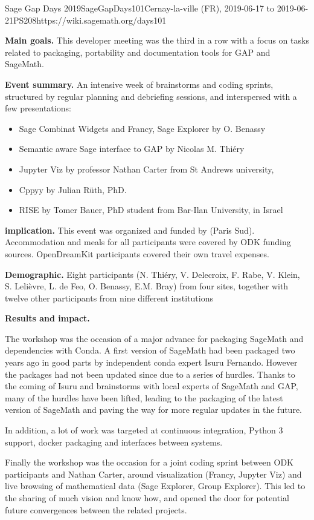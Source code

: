 \begin{event}{Sage Gap Days 2019}{SageGapDays101}{Cernay-la-ville (FR), 2019-06-17 to 2019-06-21}{PS}{20}{8}{https://wiki.sagemath.org/days101}

\textbf{Main goals.} This developer meeting was the third in a row
with a focus on \ODK tasks related to packaging, portability and
documentation tools for GAP and SageMath.


\textbf{Event summary.} An intensive week of brainstorms and coding
sprints, structured by regular planning and debriefing sessions, and
interspersed with a few presentations:
\begin{itemize}
\item Sage Combinat Widgets and Francy, Sage Explorer by O. Benassy
\item Semantic aware Sage interface to GAP by Nicolas M. Thiéry
\item Jupyter Viz by professor Nathan Carter from St Andrews
  university,
\item Cppyy by Julian Rüth, PhD.
\item RISE by Tomer Bauer, PhD student from Bar-Ilan University, in
  Israel
\end{itemize}

\textbf{\ODK implication.} This event was organized and funded by \ODK
(Paris Sud). Accommodation and meals for all participants were covered
by ODK funding sources. OpenDreamKit participants covered their own
travel expenses.

\textbf{Demographic.} Eight \ODK participants (N. Thiéry, V.
Delecroix, F. Rabe, V. Klein, S. Lelièvre, L. de Feo, O. Benassy, E.M.
Bray) from four sites, together with twelve other participants from
nine different institutions

\textbf{Results and impact.}

The workshop was the occasion of a major advance for packaging
SageMath and dependencies with Conda. A first version of SageMath had
been packaged two years ago in good parts by independent conda expert
Isuru Fernando. However the packages had not been updated since due to
a series of hurdles. Thanks to the coming of Isuru and brainstorms
with local experts of SageMath and GAP, many of the hurdles have been
lifted, leading to the packaging of the latest version of SageMath and
paving the way for more regular updates in the future.

In addition, a lot of work was targeted at continuous integration,
Python 3 support, docker packaging and interfaces between systems.

Finally the workshop was the occasion for a joint coding sprint
between ODK participants and Nathan Carter, around visualization
(Francy, Jupyter Viz) and live browsing of mathematical data (Sage
Explorer, Group Explorer). This led to the sharing of much vision and
know how, and opened the door for potential future convergences
between the related projects.
\end{event}
